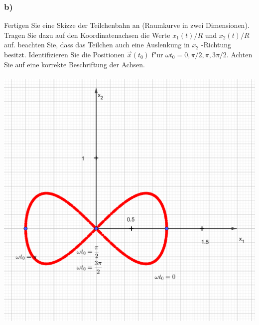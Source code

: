 \documentclass{theozettel}
\begin{document}
	\subsubsection*{b)}Fertigen Sie eine Skizze der Teilchenbahn an (Raumkurve in zwei Dimensionen). Tragen Sie dazu auf den Koordinatenachsen die Werte $x_1 \left( t \right)/R$ und $x_2 \left( t \right) /R$ auf. beachten Sie, dass das Teilchen auch eine Auslenkung in $x_2$ -Richtung besitzt. Identifizieren Sie die Positionen $\vec{x} \left( t_0 \right) $ f"ur $ \omega t_0 = 0, \pi /2, \pi, 3\pi /2$. Achten Sie auf eine korrekte Beschriftung der Achsen.\\\\
	\includegraphics[scale=2.4]{A2-2b.png}
\end{document}
